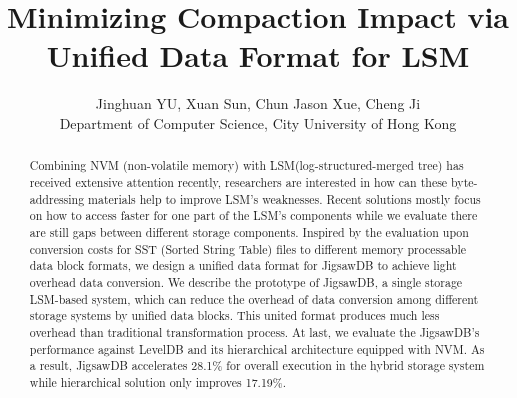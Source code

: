 \usepackage{filecontents}




\date{}

\title{\Large \bf Minimizing Compaction Impact via Unified Data Format for LSM}

\author{
	{\rm  Jinghuan YU, Xuan Sun, Chun Jason Xue, Cheng Ji}\\
	Department of Computer Science, City University of Hong Kong\\
} %
\maketitle

\begin{abstract}
Combining NVM (non-volatile memory) with LSM(log-structured-merged tree) has received extensive attention recently, researchers are interested in how can these byte-addressing materials help to improve LSM's weaknesses. Recent solutions mostly focus on how to access faster for one part of the LSM's components while we evaluate there are still gaps between different storage components. Inspired by the evaluation upon conversion costs for SST (Sorted String Table) files to different memory processable data block formats, we design a unified data format for JigsawDB to achieve light overhead data conversion. We describe the prototype of JigsawDB, a single storage LSM-based system, which can reduce the overhead of data conversion among different storage systems by unified data blocks. This united format produces much less overhead than traditional transformation process. At last, we evaluate the JigsawDB's performance against LevelDB and its hierarchical architecture equipped with NVM. As a result, JigsawDB accelerates 28.1\% for overall execution in the hybrid storage system while hierarchical solution only improves 17.19\%.
\end{abstract}


